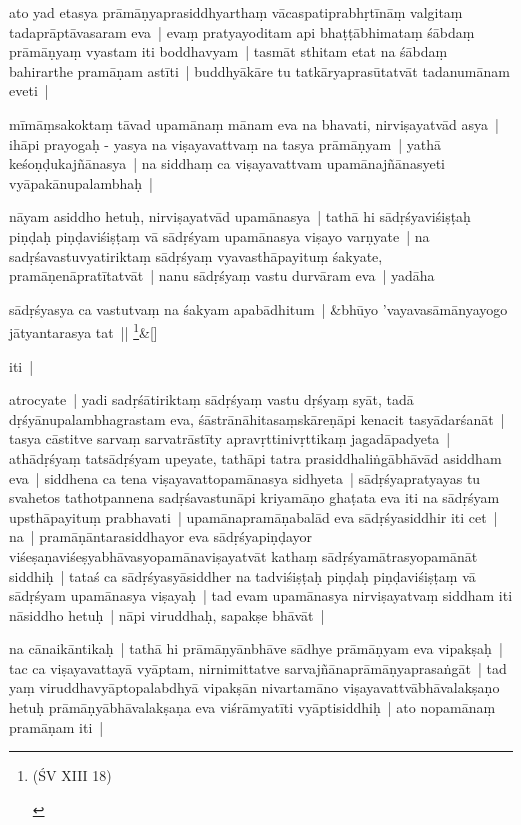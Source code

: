 \documentclass[article,12pt,a4paper]{memoir}
\begin{document}
	  \pstart ato yad etasya prāmāṇyaprasiddhyarthaṃ vācaspatiprabhṛtīnāṃ valgitaṃ tadaprāptāvasaram eva | evaṃ pratyayoditam api bhaṭṭābhimataṃ śābdaṃ prāmāṇyaṃ vyastam iti boddhavyam | tasmāt sthitam etat na śābdaṃ bahirarthe pramāṇam astīti | buddhyākāre tu tatkāryaprasūtatvāt tadanumānam eveti |
	\pend
      

	  \pstart mīmāṃsakoktaṃ tāvad upamānaṃ mānam eva na bhavati, nirviṣayatvād asya | ihāpi prayogaḥ - yasya na viṣayavattvaṃ na tasya prāmāṇyam | yathā keśoṇḍukajñānasya | na siddhaṃ ca viṣayavattvam upamānajñānasyeti vyāpakānupalambhaḥ |
	\pend
      

	  \pstart nāyam asiddho hetuḥ, nirviṣayatvād upamānasya | tathā hi sādṛśyaviśiṣṭaḥ piṇḍaḥ piṇḍaviśiṣṭaṃ vā sādṛśyam upamānasya viṣayo varṇyate | na sadṛśavastuvyatiriktaṃ sādṛśyaṃ vyavasthāpayituṃ śakyate, pramāṇenāpratītatvāt | \label{thakur75-102.14} nanu sādṛśyaṃ vastu durvāram eva | yadāha
	\pend
      
	    
	    \stanza[\smallbreak]
	sādṛśyasya ca vastutvaṃ na śakyam apabādhitum | &bhūyo 'vayavasāmānyayogo jātyantarasya tat || \footnote{\begin{english}(ŚV XIII 18)\end{english}}\&[\smallbreak]


	

	  \pstart iti |
	\pend
      

	  \pstart atrocyate | yadi sadṛśātiriktaṃ sādṛśyaṃ vastu dṛśyaṃ syāt, tadā dṛśyānupalambhagrastam eva, śāstrānāhitasaṃskāreṇāpi kenacit tasyādarśanāt | tasya cāstitve sarvaṃ sarvatrāstīty apravṛttinivṛttikaṃ jagadāpadyeta | athādṛśyaṃ tatsādṛśyam upeyate, tathāpi tatra prasiddhaliṅgābhāvād asiddham eva | siddhena ca tena viṣayavattopamānasya sidhyeta | sādṛśyapratyayas tu svahetos tathotpannena sadṛśavastunāpi kriyamāṇo ghaṭata eva iti na sādṛśyam upsthāpayituṃ prabhavati | upamānapramāṇabalād eva sādṛśyasiddhir iti cet | na | pramāṇāntarasiddhayor eva sādṛśyapiṇḍayor viśeṣaṇaviśeṣyabhāvasyopamānaviṣayatvāt kathaṃ sādṛśyamātrasyopamānāt siddhiḥ | tataś ca sādṛśyasyāsiddher na tadviśiṣṭaḥ piṇḍaḥ piṇḍaviśiṣṭaṃ vā sādṛśyam upamānasya viṣayaḥ | tad evam upamānasya nirviṣayatvaṃ siddham iti nāsiddho hetuḥ | nāpi viruddhaḥ, sapakṣe bhāvāt |
	\pend
      

	  \pstart na cānaikāntikaḥ | tathā hi prāmāṇyānbhāve sādhye prāmāṇyam eva vipakṣaḥ | tac ca viṣayavattayā vyāptam, nirnimittatve sarvajñānaprāmāṇyaprasaṅgāt | tad yaṃ viruddhavyāptopalabdhyā vipakṣān nivartamāno viṣayavattvābhāvalakṣaṇo hetuḥ prāmāṇyābhāvalakṣaṇa eva viśrāmyatīti vyāptisiddhiḥ | ato nopamānaṃ pramāṇam iti |
	\pend
      
\end{document}
